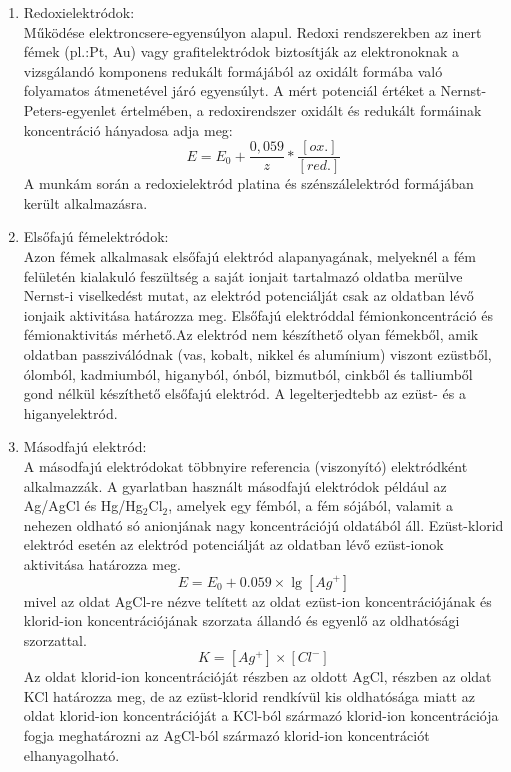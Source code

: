\begin{enumerate}
\item Redoxielektródok:\\
Működése elektroncsere-egyensúlyon alapul. Redoxi rendszerekben az inert fémek (pl.:Pt, Au) vagy grafitelektródok biztosítják az elektronoknak a vizsgálandó komponens redukált formájából az oxidált formába való folyamatos átmenetével járó egyensúlyt. A mért potenciál értéket a Nernst-Peters-egyenlet értelmében, a redoxirendszer oxidált és redukált formáinak koncentráció hányadosa adja meg:
\begin{equation}
E= E_\text{0} + \frac{0,059}{z} * \frac{[ox.]}{[red.]}
\end{equation}
A munkám során a redoxielektród platina és szénszálelektród formájában került alkalmazásra.
\item Elsőfajú fémelektródok:\\
Azon fémek alkalmasak elsőfajú elektród alapanyagának, melyeknél a  fém felületén kialakuló feszültség a saját ionjait tartalmazó oldatba merülve Nernst-i viselkedést mutat, az elektród potenciálját csak az oldatban lévő ionjaik aktivitása határozza meg. Elsőfajú elektróddal fémionkoncentráció és fémionaktivitás mérhető.Az elektród nem készíthető olyan fémekből, amik oldatban passziválódnak (vas, kobalt, nikkel és alumínium) viszont ezüstből, ólomból, kadmiumból, higanyból, ónból, bizmutból, cinkből és talliumből gond nélkül készíthető elsőfajú elektród. A legelterjedtebb az ezüst- és a higanyelektród.
\item Másodfajú elektród: \cite{pfreisich1960}\\
A másodfajú elektródokat többnyire referencia (viszonyító) elektródként alkalmazzák. A gyarlatban használt másodfajú elektródok például az Ag/AgCl és Hg/Hg$_2$Cl$_2$, amelyek egy fémból, a fém sójából, valamit a nehezen oldható só anionjának nagy koncentrációjú oldatából áll. Ezüst-klorid elektród esetén az elektród potenciálját az oldatban lévő ezüst-ionok aktivitása határozza meg.\\
\begin{equation}
E = E_0 + 0.059 \times \lg [Ag^+]
\end{equation}
mivel az oldat AgCl-re nézve telített az oldat ezüst-ion koncentrációjának és klorid-ion koncentrációjának szorzata állandó és egyenlő az oldhatósági szorzattal.\\
\begin{equation}
K = [Ag^+] \times [Cl^-]
\end{equation}
Az oldat klorid-ion koncentrációját részben az oldott AgCl, részben az oldat KCl határozza meg, de az ezüst-klorid rendkívül kis oldhatósága miatt az oldat klorid-ion koncentrációját a KCl-ból származó klorid-ion koncentrációja fogja meghatározni az AgCl-ból származó klorid-ion koncentrációt elhanyagolható.\\

\end{enumerate}
